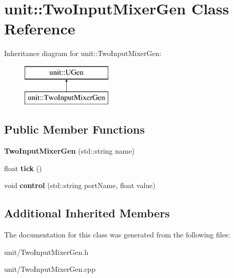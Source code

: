 \hypertarget{classunit_1_1TwoInputMixerGen}{}\section{unit\+:\+:Two\+Input\+Mixer\+Gen Class Reference}
\label{classunit_1_1TwoInputMixerGen}
Inheritance diagram for unit\+:\+:Two\+Input\+Mixer\+Gen\+:\begin{figure}[H]
\begin{center}
\leavevmode
\includegraphics[height=2.000000cm]{classunit_1_1TwoInputMixerGen}
\end{center}
\end{figure}
\subsection*{Public Member Functions}
\begin{DoxyCompactItemize}
\item 
{\bfseries Two\+Input\+Mixer\+Gen} (std\+::string name)\hypertarget{classunit_1_1TwoInputMixerGen_ae150f51a934ffb7330f8a2852b094539}{}\label{classunit_1_1TwoInputMixerGen_ae150f51a934ffb7330f8a2852b094539}

\item 
float {\bfseries tick} ()\hypertarget{classunit_1_1TwoInputMixerGen_aef96ef6828e767384a8881d108c0d52b}{}\label{classunit_1_1TwoInputMixerGen_aef96ef6828e767384a8881d108c0d52b}

\item 
void {\bfseries control} (std\+::string port\+Name, float value)\hypertarget{classunit_1_1TwoInputMixerGen_ab8d7d00eb0c692a8c2de706f58673d3d}{}\label{classunit_1_1TwoInputMixerGen_ab8d7d00eb0c692a8c2de706f58673d3d}

\end{DoxyCompactItemize}
\subsection*{Additional Inherited Members}


The documentation for this class was generated from the following files\+:\begin{DoxyCompactItemize}
\item 
unit/Two\+Input\+Mixer\+Gen.\+h\item 
unit/Two\+Input\+Mixer\+Gen.\+cpp\end{DoxyCompactItemize}
